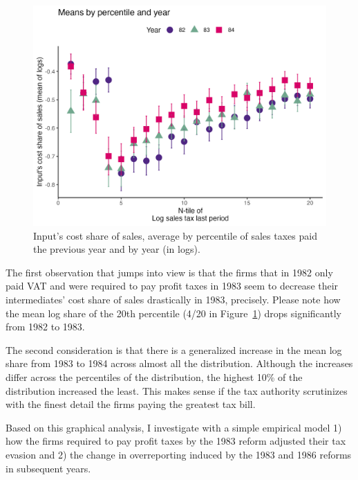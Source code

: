 \documentclass[
  12pt]{article}
\theoremstyle{definition}
\theoremstyle{remark}
\begin{document}
\begin{figure}

{\centering \includegraphics[width=1\textwidth,height=\textheight]{../Results/Figures/Colombia/night_disc_byy_lag_log_sales_tax_82-83-84_20.png}

}

\caption{\label{fig-ls-83}Input's cost share of sales, average by
percentile of sales taxes paid the previous year and by year (in logs).}

\end{figure}

The first observation that jumps into view is that the firms that in
1982 only paid VAT and were required to pay profit taxes in 1983 seem to
decrease their intermediates' cost share of sales drastically in 1983,
precisely. Please note how the mean log share of the 20th percentile
(4/20 in Figure~\ref{fig-ls-83}) drops significantly from 1982 to 1983.

The second consideration is that there is a generalized increase in the
mean log share from 1983 to 1984 across almost all the distribution.
Although the increases differ across the percentiles of the
distribution, the highest 10\% of the distribution increased the least.
This makes sense if the tax authority scrutinizes with the finest detail
the firms paying the greatest tax bill.

Based on this graphical analysis, I investigate with a simple empirical
model 1) how the firms required to pay profit taxes by the 1983 reform
adjusted their tax evasion and 2) the change in overreporting induced by
the 1983 and 1986 reforms in subsequent years.
\end{document}
